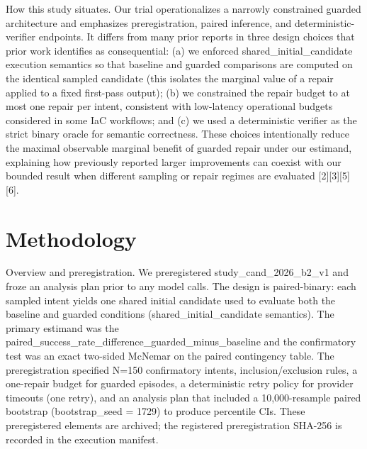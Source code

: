\documentclass[conference]{IEEEtran}
\begin{document}
How this study situates. Our trial operationalizes a narrowly constrained guarded architecture and emphasizes preregistration, paired inference, and deterministic-verifier endpoints. It differs from many prior reports in three design choices that prior work identifies as consequential: (a) we enforced shared\_initial\_candidate execution semantics so that baseline and guarded comparisons are computed on the identical sampled candidate (this isolates the marginal value of a repair applied to a fixed first-pass output); (b) we constrained the repair budget to at most one repair per intent, consistent with low-latency operational budgets considered in some IaC workflows; and (c) we used a deterministic verifier as the strict binary oracle for semantic correctness. These choices intentionally reduce the maximal observable marginal benefit of guarded repair under our estimand, explaining how previously reported larger improvements can coexist with our bounded result when different sampling or repair regimes are evaluated [2][3][5][6].

\section{Methodology}
Overview and preregistration. We preregistered study\_cand\_2026\_b2\_v1 and froze an analysis plan prior to any model calls. The design is paired-binary: each sampled intent yields one shared initial candidate used to evaluate both the baseline and guarded conditions (shared\_initial\_candidate semantics). The primary estimand was the paired\_success\_rate\_difference\_guarded\_minus\_baseline and the confirmatory test was an exact two-sided McNemar on the paired contingency table. The preregistration specified N=150 confirmatory intents, inclusion/exclusion rules, a one-repair budget for guarded episodes, a deterministic retry policy for provider timeouts (one retry), and an analysis plan that included a 10,000-resample paired bootstrap (bootstrap\_seed = 1729) to produce percentile CIs. These preregistered elements are archived; the registered preregistration SHA-256 is recorded in the execution manifest.
\end{document}
